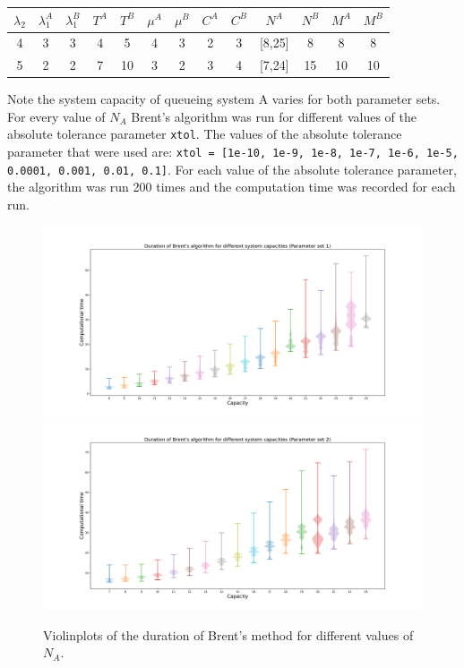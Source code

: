 \begin{center}
    \small
    \begin{tabular}{||c|c|c|c|c|c|c|c|c|c|c|c|c||}
        \hline
        \(\lambda_2\) & \(\lambda_1^A\) & \(\lambda_1^B\) & \(T^A\) & \(T^B\) &
        \(\mu^A\) & \(\mu^B\) & \(C^A\) & \(C^B\) & \(N^A\) & \(N^B\) & \(M^A\) &
        \(M^B\) \\
        \hline\hline
        4 & 3 & 3 & 4 & 5 & 4 & 3 & 2 & 3 & [8,25] & 8 & 8 & 8 \\
        \hline
        5 & 2 & 2 & 7 & 10 & 3 & 2 & 3 & 4 & [7,24] & 15 & 10 & 10 \\
        \hline
    \end{tabular}
\end{center}
    
Note the system capacity of queueing system A varies for both parameter sets.
For every value of \(N_A\) Brent's algorithm was run for different values of
the absolute tolerance parameter \lstinline[style=pystyle]{xtol}.
The values of the absolute tolerance parameter that were used are:
\lstinline[style=pystyle]
{xtol = [1e-10, 1e-9, 1e-8, 1e-7, 1e-6, 1e-5, 0.0001, 0.001, 0.01, 0.1]}.
For each value of the absolute tolerance parameter, the algorithm was run 200
times and the computation time was recorded for each run.


\begin{figure}[H]
    \centering
    \includegraphics[width=\textwidth]{chapters/04_game_theoretic_model/img/brents_method/tolerance/tolerance_violinplots_1.pdf}
    \includegraphics[width=\textwidth]{chapters/04_game_theoretic_model/img/brents_method/tolerance/tolerance_violinplots_2.pdf}
    \caption{
        Violinplots of the duration of Brent's method for different values of
        \(N_A\).
    }
    \label{fig:tolerance_violinplots}
\end{figure}

